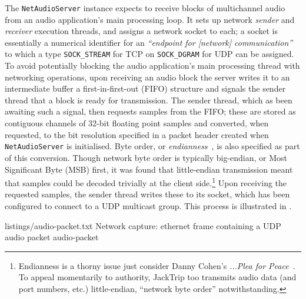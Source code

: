 The \texttt{NetAudioServer} instance expects to receive blocks of
multichannel audio from an audio application's main processing loop.
It sets up network \textit{sender} and \textit{receiver} execution threads, and
assigns a network socket to each; a socket is essentially a numerical identifier
for an
\textit{``endpoint for [network] communication''}~\citep{kerrisk_socket2_2023}
to which a type \textemdash{} \texttt{SOCK\_STREAM} for TCP on
\texttt{SOCK\_DGRAM} for UDP \textemdash{} can be assigned.
To avoid potentially blocking the audio application's main processing thread
with networking operations, upon receiving an audio block the server writes it
to an intermediate buffer \textemdash{} a first-in-first-out (FIFO) structure
\textemdash{} and signals the sender thread that a block is ready for
transmission.
The sender thread, which as been awaiting such a signal, then requests samples
from the FIFO; these are stored as contiguous channels of 32-bit floating point
samples and converted, when requested, to the bit resolution specified in a
packet header created when \texttt{NetAudioServer} is initialised.
Byte order, or \textit{endianness}~\citep{cohen_holy_1981}, is also specified as
part of this conversion.
Though network byte order is typically big-endian, or Most Significant Byte
(MSB) first, it was found that little-endian transmission meant that samples
could be decoded trivially at the client side.\footnote{
    Endianness is a thorny issue \textemdash{} just consider Danny Cohen's
    \textit{...Plea for Peace}~\citep{cohen_holy_1981}.
    To appeal momentarily to authority, JackTrip too transmits audio data (and
    port numbers, etc.) little-endian, ``network byte order'' notwithstanding.
}
Upon receiving the requested samples, the sender thread writes these to its
socket, which has been configured to connect to a UDP multicast group.
This process is illustrated in .

{listings/audio-packet.txt}
{Network capture: ethernet frame containing a UDP audio packet}
{audio-packet}

